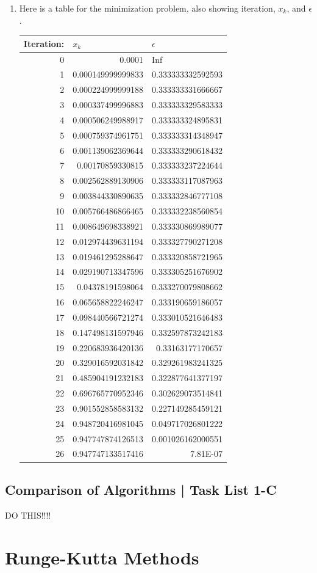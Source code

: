 \documentclass[12pt]{extarticle}
\begin{document}
\begin{enumerate}
\newpage
\item Here is a table for the minimization problem, also showing iteration, $x_k$, and $\epsilon$. 
\begin{center}
\begin{tabular}{|r|r|r|}
\hline
\multicolumn{1}{|l|}{Iteration:} & \multicolumn{1}{l|}{$x_k$} & \multicolumn{1}{l|}{$\epsilon$} \\ \hline
0 & 0.0001 & \multicolumn{1}{l|}{Inf} \\ \hline
1 & 0.000149999999833 & 0.333333332592593 \\ \hline
2 & 0.000224999999188 & 0.333333331666667 \\ \hline
3 & 0.000337499996883 & 0.333333329583333 \\ \hline
4 & 0.000506249988917 & 0.333333324895831 \\ \hline
5 & 0.000759374961751 & 0.333333314348947 \\ \hline
6 & 0.001139062369644 & 0.333333290618432 \\ \hline
7 & 0.00170859330815 & 0.333333237224644 \\ \hline
8 & 0.002562889130906 & 0.333333117087963 \\ \hline
9 & 0.003844330890635 & 0.333332846777108 \\ \hline
10 & 0.005766486866465 & 0.333332238560854 \\ \hline
11 & 0.008649698338921 & 0.333330869989077 \\ \hline
12 & 0.012974439631194 & 0.333327790271208 \\ \hline
13 & 0.019461295288647 & 0.333320858721965 \\ \hline
14 & 0.029190713347596 & 0.333305251676902 \\ \hline
15 & 0.04378191598064 & 0.333270079808662 \\ \hline
16 & 0.065658822246247 & 0.333190659186057 \\ \hline
17 & 0.098440566721274 & 0.333010521646483 \\ \hline
18 & 0.147498131597946 & 0.332597873242183 \\ \hline
19 & 0.220683936420136 & 0.33163177170657 \\ \hline
20 & 0.329016592031842 & 0.329261983241325 \\ \hline
21 & 0.485904191232183 & 0.322877641377197 \\ \hline
22 & 0.696765770952346 & 0.302629073514841 \\ \hline
23 & 0.901552858583132 & 0.227149285459121 \\ \hline
24 & 0.948720416981045 & 0.049717026801222 \\ \hline
25 & 0.947747874126513 & 0.001026162000551 \\ \hline
26 & 0.947747133517416 & 7.81E-07 \\ \hline
\end{tabular}
\label{}
\end{center}
\end{enumerate}

\subsection{Comparison of Algorithms | Task List 1-C}
DO THIS!!!!


\section{Runge-Kutta Methods}
\end{document}
